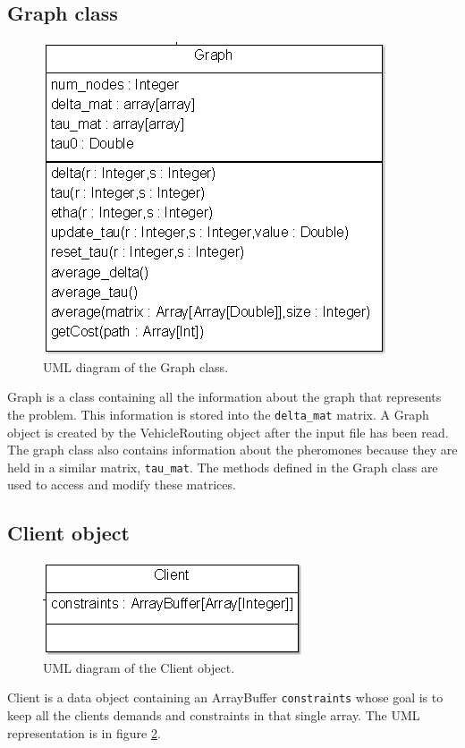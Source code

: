 \subsection{Graph class}
\begin{figure}
	\centering
		\includegraphics[scale = 0.5]{images/graph.png}
	\caption{UML diagram of the Graph class.}
	\label{fig:graph}
\end{figure}
Graph is a class containing all the information about the graph that represents the problem. This information is stored into the \texttt{delta\_mat} matrix. A Graph object is created by the VehicleRouting object after the input file has been read.
The graph class also contains information about the pheromones because they are held in a similar matrix, \texttt{tau\_mat}. The methods defined in the Graph class are used to access and modify these matrices.

\subsection{Client object}
\begin{figure}
	\centering
		\includegraphics[scale = 0.5]{images/client.png}
	\caption{UML diagram of the Client object.}
	\label{fig:client}
\end{figure}
Client is a data object containing an ArrayBuffer \texttt{constraints} whose goal is to keep all the clients demands and constraints in that single array. The UML representation is in figure \ref{fig:client}.

